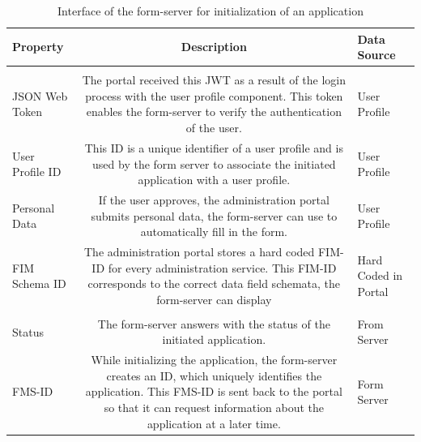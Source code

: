 \documentclass[
     12pt,         %
     a4paper,      %
     BCOR=10mm,version=first,     %
     DIV=14,version=first,        %
     ]{scrreprt}
\begin{document}
        \begin{table}[!h]
            \begin{tabularx}{\textwidth}{|l|C|l|}
            \hline
            Property & Description & Data Source \\
            \hline
             \\
            \hline
            
            JSON Web Token & The portal received this JWT as a result of the login process with the user profile component. This token enables the form-server to verify the authentication of the user. & User Profile \\
            
            \hline
            
            User Profile ID & This ID is a unique identifier of a user profile and is used by the form server to associate the initiated application with a user profile. & User Profile \\
            
            \hline
            
            Personal Data & If the user approves, the administration portal submits personal data, the form-server can use to automatically fill in the form. & User Profile \\
            
            \hline
            
            FIM Schema ID & The administration portal stores a hard coded FIM-ID for every administration service. This FIM-ID corresponds to the correct data field schemata, the form-server can display & Hard Coded in Portal \\
            
            \hline
             \\
            \hline
            
            Status & The form-server answers with the status of the initiated application. & From Server \\
            
            \hline
            
            FMS-ID & While initializing the application, the form-server creates an ID, which uniquely identifies the application. This FMS-ID is sent back to the portal so that it can request information about the application at a later time. & Form Server \\
            
            \hline
            \end{tabularx}
            \caption{Interface of the form-server for initialization of an application}
            \label{table:interface_form_initialization}
        \end{table}
\end{document}
